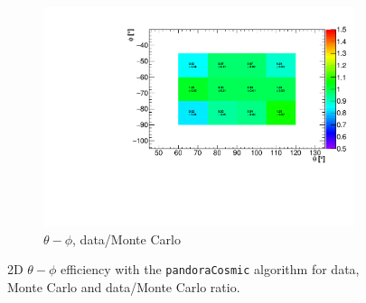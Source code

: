 \documentclass[a4paper]{scrartcl}
\begin{document}
\begin{figure}[htbp]
\begin{center}
\begin{subfigure}{0.52\textwidth}
    \includegraphics[width=\linewidth]{figures/ratio_theta_phi.pdf}
    \caption{$\theta - \phi$, data/Monte Carlo}\label{fig:2d_cry_ratio}
  \end{subfigure}
  \caption{2D $\theta - \phi$ efficiency with the \texttt{pandoraCosmic} algorithm for data, Monte Carlo and data/Monte Carlo ratio.} \label{fig:cry_mc_2d}
\end{center}
\end{figure}
\end{document}
